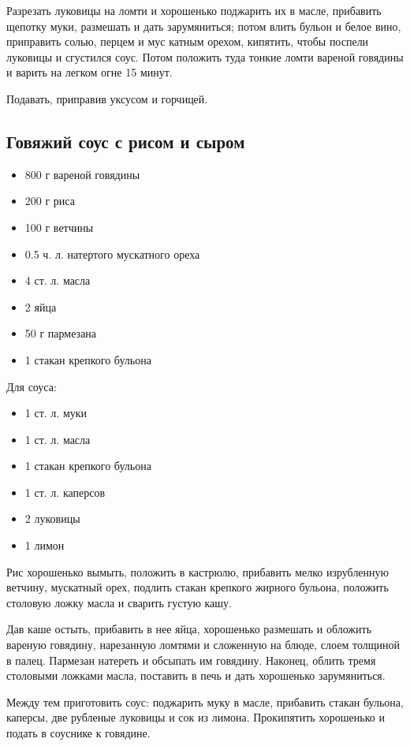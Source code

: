 Разрезать луковицы на ломти и хорошенько поджарить их в масле, прибавить щепотку муки, размешать и дать зарумяниться; потом влить бульон и белое вино, приправить солью, перцем и мус катным орехом, кипятить, чтобы поспели луковицы и сгустился соус. Потом положить туда тонкие ломти вареной говядины и варить на легком огне 15 минут.

Подавать, приправив уксусом и горчицей.

\subsection{Говяжий соус с рисом и сыром}

\begin{itemize}
	\item 800 г вареной говядины
    \item 200 г риса 
    \item 100 г ветчины
    \item 0.5 ч. л. натертого мускатного ореха 
    \item 4 ст. л. масла 
    \item 2 яйца
    \item 50 г пармезана
    \item 1 стакан крепкого бульона 
\end{itemize}

Для соуса: 
    
\begin{itemize}
	\item 1 ст. л. муки
    \item 1 ст. л. масла 
    \item 1 стакан крепкого бульона 
    \item 1 ст. л. каперсов
    \item 2 луковицы
    \item 1 лимон
\end{itemize}

Рис хорошенько вымыть, положить в кастрюлю, прибавить мелко изрубленную ветчину, мускатный орех, подлить стакан крепкого жирного бульона, положить столовую ложку масла и сварить густую кашу.

Дав каше остыть, прибавить в нее яйца, хорошенько размешать и обложить вареную говядину, нарезанную ломтями и сложенную на блюде, слоем толщиной в палец. Пармезан натереть и обсыпать им говядину. Наконец, облить тремя столовыми ложками масла, поставить в печь и дать хорошенько зарумяниться.

Между тем приготовить соус: поджарить муку в масле, прибавить стакан бульона, каперсы, две рубленые луковицы и сок из лимона. Прокипятить хорошенько и подать в соуснике к говядине.


